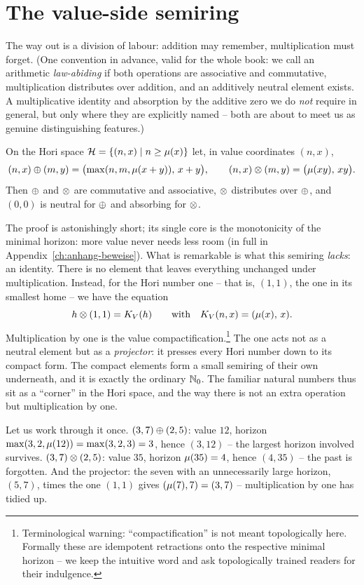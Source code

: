 \section{The value-side semiring}

The way out is a division of labour: addition may remember,
multiplication must forget. (One convention in advance, valid for
the whole book: we call an arithmetic \emph{law-abiding} if both
operations are associative and commutative, multiplication
distributes over addition, and an additively neutral element
exists. A multiplicative identity and absorption by the additive
zero we do \emph{not} require in general, but only where they are
explicitly named -- both are about to meet us as genuine
distinguishing features.)

\begin{satz}\label{satz:a3}
On the Hori space $\mathcal H=\{(n,x)\mid n\ge\mu(x)\}$ let, in value
coordinates $(n,x)$,
\[
(n,x)\oplus(m,y)=\bigl(\max(n,m,\mu(x+y)),\,x+y\bigr),
\qquad
(n,x)\otimes(m,y)=\bigl(\mu(xy),\,xy\bigr).
\]
Then $\oplus$ and $\otimes$ are commutative and associative,
$\otimes$ distributes over $\oplus$, and $(0,0)$ is neutral for
$\oplus$ and absorbing for $\otimes$.
\end{satz}

The proof is astonishingly short; its single core is the
monotonicity of the minimal horizon: more value never needs less
room (in full in Appendix~\ref{ch:anhang-beweise}).
What is remarkable is what this semiring \emph{lacks}: an identity.
There is no element that leaves everything unchanged under
multiplication. Instead, for the Hori number one -- that is,
$(1,1)$, the one in its smallest home -- we have the equation
\[
h\otimes(1,1)=K_V(h)
\qquad\text{with}\quad
K_V(n,x)=(\mu(x),\,x).
\]
Multiplication by one is the value
compactification.\footnote{Terminological warning:
``compactification'' is not meant topologically here. Formally
these are idempotent retractions onto the respective minimal
horizon -- we keep the intuitive word and ask topologically trained
readers for their indulgence.} The one acts
not as a neutral element but as a \emph{projector}: it presses
every Hori number down to its compact form. The compact elements
form a small semiring of their own underneath, and it is exactly
the ordinary $\mathbb N_0$. The familiar natural numbers thus sit as a
``corner'' in the Hori space, and the way there is not an extra
operation but multiplication by one.

\begin{beispiel}
Let us work through it once. $(3,7)\oplus(2,5)$: value $12$,
horizon $\max(3,2,\mu(12))=\max(3,2,3)=3$, hence $(3,12)$ -- the
largest horizon involved survives. $(3,7)\otimes(2,5)$: value $35$,
horizon $\mu(35)=4$, hence $(4,35)$ -- the past is forgotten. And
the projector: the seven with an unnecessarily large horizon,
$(5,7)$, times the one $(1,1)$ gives
$(\mu(7),7)=(3,7)$ -- multiplication by one has tidied up.
\end{beispiel}


